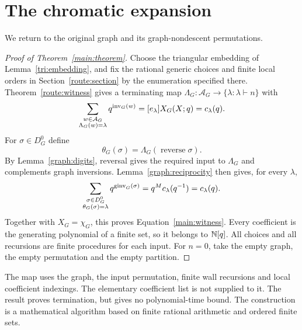 \section{The chromatic expansion}
\label{main:completion}

We return to the original graph and its graph-nondescent permutations.

\begin{proof}[Proof of Theorem~\ref{main:theorem}]
Choose the triangular embedding of Lemma~\ref{tri:embedding}, and
fix the rational generic choices and finite local orders in
Section~\ref{route:section} by the enumeration specified there.
Theorem~\ref{route:witness} gives a terminating map
$\Lambda_G:\mathcal A_G\to\{\lambda:\lambda\vdash n\}$ with
\[
 \sum_{\substack{w\in\mathcal A_G\\\Lambda_G(w)=\lambda}}
       q^{\operatorname{inv}_G(w)}
   =[e_\lambda]X_G(X;q)=c_\lambda(q).
\]
For $\sigma\in D_G^0$ define
\[
 \theta_G(\sigma)=\Lambda_G(\operatorname{reverse}\sigma).
\]
By Lemma~\ref{graph:digits}, reversal gives the required input to
$\Lambda_G$ and complements graph inversions. Lemma~\ref{graph:reciprocity}
then gives, for every $\lambda$,
\[
 \sum_{\substack{\sigma\in D_G^0\\\theta_G(\sigma)=\lambda}}
       q^{\operatorname{ginv}_G(\sigma)}
   =q^M c_\lambda(q^{-1})=c_\lambda(q).
\]
Together with $X_G=\chi_G$, this proves
Equation~\eqref{main:witness}. Every coefficient is the generating
polynomial of a finite set, so it belongs to $\mathbb N[q]$. All choices and
all recursions are finite procedures for each input. For $n=0$, take
the empty graph, the empty permutation and the empty partition.
\end{proof}

\begin{remark}
The map uses the graph, the input permutation, finite wall recursions
and local coefficient indexings. The elementary coefficient list is
not supplied to it. The result proves termination, but gives no
polynomial-time bound. The construction is a mathematical algorithm
based on finite rational arithmetic and ordered finite sets.
\end{remark}
